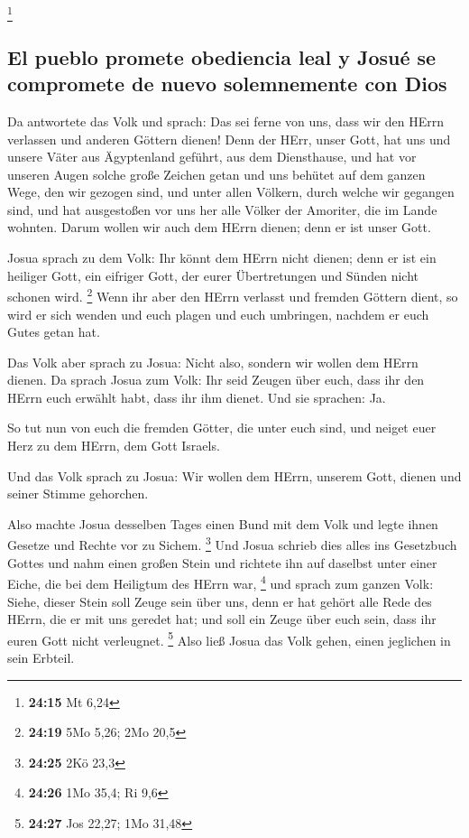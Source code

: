 \footnote{\textbf{24:15} Mt 6,24}

\hypertarget{el-pueblo-promete-obediencia-leal-y-josuuxe9-se-compromete-de-nuevo-solemnemente-con-dios}{%
\subsection{El pueblo promete obediencia leal y Josué se compromete de
nuevo solemnemente con
Dios}\label{el-pueblo-promete-obediencia-leal-y-josuuxe9-se-compromete-de-nuevo-solemnemente-con-dios}}

 Da antwortete das Volk und sprach: Das sei ferne von
uns, dass wir den HErrn verlassen und anderen Göttern dienen!
 Denn der HErr, unser Gott, hat uns und unsere Väter aus
Ägyptenland geführt, aus dem Diensthause, und hat vor unseren Augen
solche große Zeichen getan und uns behütet auf dem ganzen Wege, den wir
gezogen sind, und unter allen Völkern, durch welche wir gegangen sind,
 und hat ausgestoßen vor uns her alle Völker der
Amoriter, die im Lande wohnten. Darum wollen wir auch dem HErrn dienen;
denn er ist unser Gott.

 Josua sprach zu dem Volk: Ihr könnt dem HErrn nicht
dienen; denn er ist ein heiliger Gott, ein eifriger Gott, der eurer
Übertretungen und Sünden nicht schonen wird. \footnote{\textbf{24:19}
  5Mo 5,26; 2Mo 20,5}  Wenn ihr aber den HErrn verlasst
und fremden Göttern dient, so wird er sich wenden und euch plagen und
euch umbringen, nachdem er euch Gutes getan hat.

 Das Volk aber sprach zu Josua: Nicht also, sondern wir
wollen dem HErrn dienen.  Da sprach Josua zum Volk: Ihr
seid Zeugen über euch, dass ihr den HErrn euch erwählt habt, dass ihr
ihm dienet. Und sie sprachen: Ja.

 So tut nun von euch die fremden Götter, die unter euch
sind, und neiget euer Herz zu dem HErrn, dem Gott Israels.

 Und das Volk sprach zu Josua: Wir wollen dem HErrn,
unserem Gott, dienen und seiner Stimme gehorchen.

 Also machte Josua desselben Tages einen Bund mit dem
Volk und legte ihnen Gesetze und Rechte vor zu Sichem. \footnote{\textbf{24:25}
  2Kö 23,3}  Und Josua schrieb dies alles ins Gesetzbuch
Gottes und nahm einen großen Stein und richtete ihn auf daselbst unter
einer Eiche, die bei dem Heiligtum des HErrn war, \footnote{\textbf{24:26}
  1Mo 35,4; Ri 9,6}  und sprach zum ganzen Volk: Siehe,
dieser Stein soll Zeuge sein über uns, denn er hat gehört alle Rede des
HErrn, die er mit uns geredet hat; und soll ein Zeuge über euch sein,
dass ihr euren Gott nicht verleugnet. \footnote{\textbf{24:27} Jos
  22,27; 1Mo 31,48}  Also ließ Josua das Volk gehen,
einen jeglichen in sein Erbteil.

